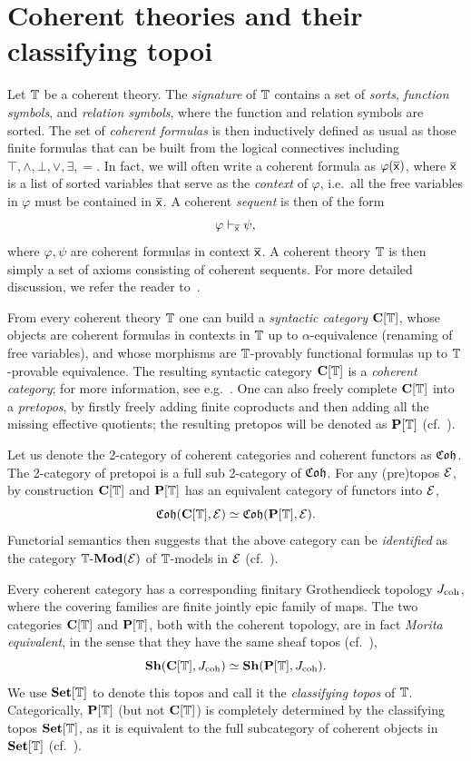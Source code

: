 \section{Coherent theories and their classifying topoi}\label{sec:cohtheory}

Let $\mathbb{T}$ be a coherent theory. The \emph{signature} of $\mathbb{T}$ contains a set of \emph{sorts}, \emph{function symbols}, and \emph{relation symbols}, where the function and relation symbols are sorted. The set of \emph{coherent formulas} is then inductively defined as usual as those finite formulas that can be built from the logical connectives including $\top,\wedge,\bot,\vee,\exists,=$. In fact, we will often write a coherent formula as $\varphi(\overline{\mathsf{x}})$, where $\overline{\mathsf{x}}$ is a list of sorted variables that serve as the \emph{context} of $\varphi$, i.e.\ all the free variables in $\varphi$ must be contained in $\overline{\mathsf{x}}$. A coherent \emph{sequent} is then of the form 
\[ \varphi \vdash_{\overline{\mathsf{x}}} \psi, \]
where $\varphi,\psi$ are coherent formulas in context $\overline{\mathsf{x}}$. A coherent theory $\mathbb{T}$ is then simply a set of axioms consisting of coherent sequents. For more detailed discussion, we refer the reader to~\citet[D1.1]{johnstone2002sketches}. 

From every coherent theory $\mathbb{T}$ one can build a \emph{syntactic category} $\mathbf{C}[\mathbb{T}]$, whose objects are coherent formulas in contexts in $\mathbb{T}$ up to $\alpha$-equivalence (renaming of free variables), and whose morphisms are $\mathbb{T}$-provably functional formulas up to $\mathbb{T}$-provable equivalence. The resulting syntactic category $\mathbf{C}[\mathbb{T}]$ is a \emph{coherent category}; for more information, see e.g.~\citet[D1.4]{johnstone2002sketches}. One can also freely complete $\mathbf{C}[\mathbb{T}]$ into a \emph{pretopos}, by firstly freely adding finite coproducts and then adding all the missing effective quotients; the resulting pretopos will be denoted as $\mathbf{P}[\mathbb{T}]$ (cf.~\citet[D1.4.12(ii)]{johnstone2002sketches}). 

Let us denote the 2-category of coherent categories and coherent functors as $\mathfrak{Coh}$. The 2-category of pretopoi is a full sub 2-category of $\mathfrak{Coh}$. For any (pre)topos $\mathcal{E}$, by construction $\mathbf{C}[\mathbb{T}]$ and $\mathbf{P}[\mathbb{T}]$ has an equivalent category of functors into $\mathcal{E}$,
\[ \mathfrak{Coh}(\mathbf{C}[\mathbb{T}],\mathcal{E}) \simeq \mathfrak{Coh}(\mathbf{P}[\mathbb{T}],\mathcal{E}). \]
Functorial semantics then suggests that the above category can be \emph{identified} as the category $\mathbb{T}\text{-}\mathbf{Mod}(\mathcal{E})$ of $\mathbb{T}$-models in $\mathcal{E}$ (cf.~\citet[D1.2]{johnstone2002sketches}).

Every coherent category has a corresponding finitary Grothendieck topology $J_{\mathrm{coh}}$, where the covering families are finite jointly epic family of maps. The two categories $\mathbf{C}[\mathbb{T}]$ and $\mathbf{P}[\mathbb{T}]$, both with the coherent topology, are in fact \emph{Morita equivalent}, in the sense that they have the same sheaf topos (cf.~\cite[C2.2.3]{johnstone2002sketches}),
\[ \mathbf{Sh}(\mathbf{C}[\mathbb{T}],J_{\mathrm{coh}}) \simeq \mathbf{Sh}(\mathbf{P}[\mathbb{T}],J_{\mathrm{coh}}). \]
We use $\mathbf{Set}[\mathbb{T}]$ to denote this topos and call it the \emph{classifying topos} of $\mathbb{T}$. Categorically, $\mathbf{P}[\mathbb{T}]$ (but not $\mathbf{C}[\mathbb{T}]$) is completely determined by the classifying topos $\mathbf{Set}[\mathbb{T}]$, as it is equivalent to the full subcategory of coherent objects in $\mathbf{Set}[\mathbb{T}]$ (cf.~\citet[D3.3.8]{johnstone2002sketches}).


